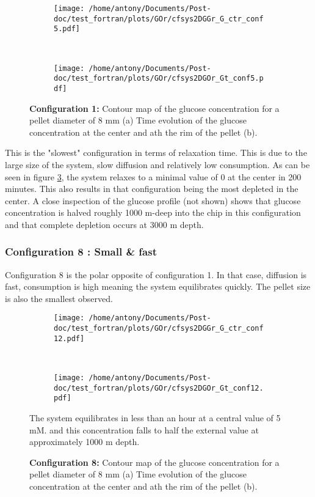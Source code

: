 \documentclass[11pt,a4paper]{article}
\begin{document}
\begin{figure}[ht!]
	\begin{subfigure}{0.45\textwidth}
	\centering
	\texttt{[image: /home/antony/Documents/Post-doc/test\_fortran/plots/GOr/cfsys2DGGr\_G\_ctr\_conf5.pdf]}
	\caption{ \label{G_ctr_conf5}}
	\end{subfigure}
	~~
	\begin{subfigure}{0.45\textwidth}
	\texttt{[image: /home/antony/Documents/Post-doc/test\_fortran/plots/GOr/cfsys2DGOr\_Gt\_conf5.pdf]}
		\caption{ \label{Gt_conf5}}
	\end{subfigure}
	\caption{\textbf{Configuration 1:} Contour map of the glucose concentration for a pellet diameter of 8 mm (a) Time evolution of the glucose concentration at the center and ath the rim of the pellet (b). \label{G_t_ctr_1}}
\end{figure}

This is the "slowest" configuration in terms of relaxation time. This is due to the large size of the system, slow diffusion and relatively low consumption. As can be seen in figure \ref{G_t_ctr_1}, the system relaxes to a minimal value of 0 at the center in 200 minutes. This also results in that configuration being the most depleted in the center. A close inspection of the glucose profile (not shown) shows that glucose concentration is halved roughly 1000 \textmu m-deep into the chip in this configuration and that complete depletion occurs at 3000 \textmu m depth.

\newpage
\subsubsection{Configuration 8 : Small \& fast}
Configuration 8 is the polar opposite of configuration 1. In that case, diffusion is fast, consumption is high meaning the system equilibrates quickly. The pellet size is also the smallest observed.

\begin{figure}[ht!]
	\begin{subfigure}{0.45\textwidth}
	\centering
	\texttt{[image: /home/antony/Documents/Post-doc/test\_fortran/plots/GOr/cfsys2DGGr\_G\_ctr\_conf12.pdf]}
	\caption{ \label{G_ctr_conf12}}
	\end{subfigure}
	~~
	\begin{subfigure}{0.45\textwidth}
	\texttt{[image: /home/antony/Documents/Post-doc/test\_fortran/plots/GOr/cfsys2DGOr\_Gt\_conf12.pdf]}
		\caption{ \label{Gt_conf12}}
	\end{subfigure}
	\caption{\textbf{Configuration 8:} Contour map of the glucose concentration for a pellet diameter of 8 mm (a) Time evolution of the glucose concentration at the center and ath the rim of the pellet (b). \label{G_t_ctr_8}}
	
The system equilibrates in less than an hour at a central value of 5 mM. and this concentration falls to half the external value at approximately 1000 \textmu m depth.
\end{figure}
\end{document}
